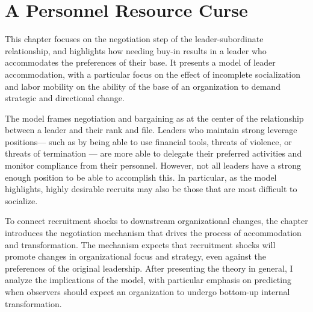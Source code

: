
\chapter{A Personnel Resource Curse}
\label{chapter:theory}



This chapter focuses on the negotiation step of the leader-subordinate relationship, and highlights how needing buy-in results in a leader who accommodates the preferences of their base. It presents a model of leader accommodation, with a particular focus on the effect of incomplete socialization and labor mobility on the ability of the base of an organization to demand strategic and directional change. 

The model frames negotiation and bargaining as at the center of the relationship between a leader and their rank and file. Leaders who maintain strong leverage positions— such as by being able to use financial tools, threats of violence, or threats of termination — are more able to delegate their preferred activities and monitor compliance from their personnel.  However, not all leaders have a strong enough position to be able to accomplish this. In particular, as the model highlights, highly desirable recruits may also be those that are most difficult to socialize.

To connect recruitment shocks to downstream organizational changes, the chapter introduces the negotiation mechanism that drives the process of accommodation and transformation. The mechanism expects that recruitment shocks will promote changes in organizational focus and strategy, even against the preferences of the original leadership. After presenting the theory in general, I analyze the implications of the model, with particular emphasis on predicting when observers should expect an organization to undergo bottom-up internal transformation.


